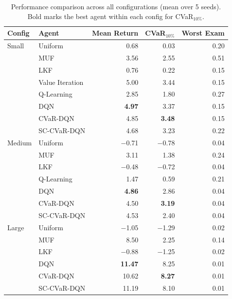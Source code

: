 \documentclass[a4paper,11pt]{article}
\theoremstyle{definition}
\begin{document}
\begin{table}[H]
\centering
\caption{Performance comparison across all configurations (mean over 5 seeds). Bold marks the best agent within each config for CVaR$_{10\%}$.}
\label{tab:main_results}
\begin{tabular}{llrrr}
\toprule
Config & Agent & Mean Return & CVaR$_{10\%}$ & Worst Exam \\
\midrule
Small
& Uniform           & 0.68  & 0.03  & 0.20 \\
& MUF               & 3.56  & 2.55  & 0.51 \\
& LKF               & 0.76  & 0.22  & 0.15 \\
& Value Iteration   & 5.00  & 3.44  & 0.15 \\
& Q-Learning        & 2.85  & 1.80  & 0.27 \\
& DQN               & \textbf{4.97}  & 3.37  & 0.15 \\
& CVaR-DQN          & 4.85  & \textbf{3.48} & 0.15 \\
& SC-CVaR-DQN       & 4.68  & 3.23  & 0.22 \\
\midrule
Medium
& Uniform           & $-$0.71 & $-$0.78 & 0.04 \\
& MUF               & 3.11    & 1.38    & 0.24 \\
& LKF               & $-$0.48 & $-$0.72 & 0.04 \\
& Q-Learning        & 1.47    & 0.59    & 0.21 \\
& DQN               & \textbf{4.86}    & 2.86    & 0.04 \\
& CVaR-DQN          & 4.50    & \textbf{3.19}    & 0.04 \\
& SC-CVaR-DQN       & 4.53    & 2.40    & 0.04 \\
\midrule
Large
& Uniform           & $-$1.05 & $-$1.29 & 0.02 \\
& MUF               & 8.50    & 2.25    & 0.14 \\
& LKF               & $-$0.88 & $-$1.25 & 0.02 \\
& DQN               & \textbf{11.47}   & 8.25    & 0.01 \\
& CVaR-DQN          & 10.62   & \textbf{8.27}    & 0.01 \\
& SC-CVaR-DQN       & 11.19   & 8.10    & 0.01 \\
\bottomrule
\end{tabular}
\end{table}
\end{document}
